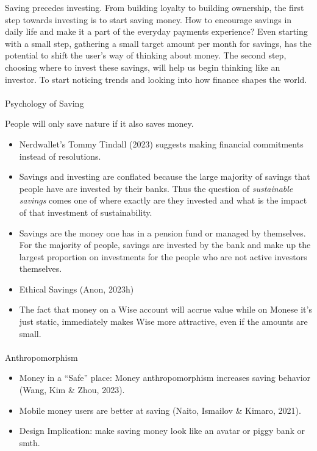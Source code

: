 \documentclass[
  letterpaper,
  DIV=11,
  numbers=noendperiod]{scrartcl}
\makeatletter
\let\oldparagraph\paragraph
\renewcommand{\paragraph}{
    \@ifstar
      \xxxParagraphStar
      \xxxParagraphNoStar
  }
\newcommand{\xxxParagraphStar}[1]{\oldparagraph*{#1}\mbox{}}
\newcommand{\xxxParagraphNoStar}[1]{\oldparagraph{#1}\mbox{}}
\makeatother
\begin{document}
Saving precedes investing. From building loyalty to building ownership,
the first step towards investing is to start saving money. How to
encourage savings in daily life and make it a part of the everyday
payments experience? Even starting with a small step, gathering a small
target amount per month for savings, has the potential to shift the
user's way of thinking about money. The second step, choosing where to
invest these savings, will help us begin thinking like an investor. To
start noticing trends and looking into how finance shapes the world.

\paragraph{Psychology of Saving}\label{psychology-of-saving}

People will only save nature if it also saves money.

\begin{itemize}
\item
  Nerdwallet's Tommy Tindall (2023) suggests making financial
  commitments instead of resolutions.
\item
  Savings and investing are conflated because the large majority of
  savings that people have are invested by their banks. Thus the
  question of \emph{sustainable savings} comes one of where exactly are
  they invested and what is the impact of that investment of
  sustainability.
\item
  Savings are the money one has in a pension fund or managed by
  themselves. For the majority of people, savings are invested by the
  bank and make up the largest proportion on investments for the people
  who are not active investors themselves.
\item
  Ethical Savings (Anon, 2023h)
\item
  The fact that money on a Wise account will accrue value while on
  Monese it's just static, immediately makes Wise more attractive, even
  if the amounts are small.
\end{itemize}

\paragraph{Anthropomorphism}\label{anthropomorphism}

\begin{itemize}
\item
  Money in a ``Safe'' place: Money anthropomorphism increases saving
  behavior (Wang, Kim \& Zhou, 2023).
\item
  Mobile money users are better at saving (Naito, Ismailov \& Kimaro,
  2021).
\item
  Design Implication: make saving money look like an avatar or piggy
  bank or smth.
\end{itemize}
\end{document}
